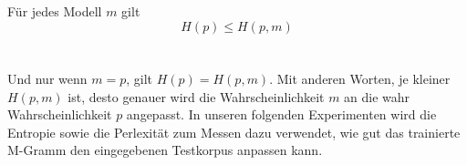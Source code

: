 \\
\\
F\"ur jedes Modell $m$ gilt \\
\begin{equation}
H(p)\leq H(p,m)
\end{equation}
\\
\\
Und nur wenn $m=p$, gilt $H(p)=H(p,m)$. Mit anderen Worten, je kleiner $H(p,m)$ ist, desto genauer wird die Wahrscheinlichkeit $m$ an die wahr Wahrscheinlichkeit $p$ angepasst.
In unseren folgenden Experimenten wird die Entropie sowie die Perlexit\"at zum Messen dazu verwendet, wie gut das trainierte M-Gramm den eingegebenen Testkorpus anpassen kann.

